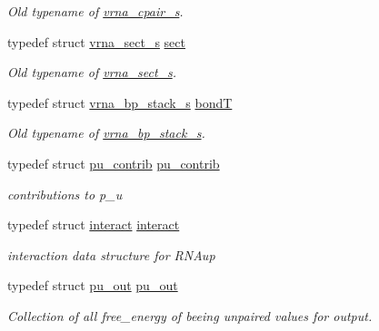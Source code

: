 \begin{DoxyCompactItemize}
\begin{DoxyCompactList}\small\item\em Old typename of \mbox{\hyperlink{group__data__structures_structvrna__cpair__s}{vrna\+\_\+cpair\+\_\+s}}. \end{DoxyCompactList}\item 
typedef struct \mbox{\hyperlink{group__data__structures_structvrna__sect__s}{vrna\+\_\+sect\+\_\+s}} \mbox{\hyperlink{group__data__structures_gaaacedee1f05d3d45aa6764eca51a8876}{sect}}
\begin{DoxyCompactList}\small\item\em Old typename of \mbox{\hyperlink{group__data__structures_structvrna__sect__s}{vrna\+\_\+sect\+\_\+s}}. \end{DoxyCompactList}\item 
typedef struct \mbox{\hyperlink{group__data__structures_structvrna__bp__stack__s}{vrna\+\_\+bp\+\_\+stack\+\_\+s}} \mbox{\hyperlink{group__data__structures_gaaeed53a7508c6ce549a98223e94b25df}{bondT}}
\begin{DoxyCompactList}\small\item\em Old typename of \mbox{\hyperlink{group__data__structures_structvrna__bp__stack__s}{vrna\+\_\+bp\+\_\+stack\+\_\+s}}. \end{DoxyCompactList}\item 
typedef struct \mbox{\hyperlink{group__data__structures_structpu__contrib}{pu\+\_\+contrib}} \mbox{\hyperlink{group__data__structures_ga20881ac02e5932356c09b070efedb560}{pu\+\_\+contrib}}
\begin{DoxyCompactList}\small\item\em contributions to p\+\_\+u \end{DoxyCompactList}\item 
typedef struct \mbox{\hyperlink{group__data__structures_structinteract}{interact}} \mbox{\hyperlink{group__data__structures_ga5a052dbe39d3ca1b13932934b13f5263}{interact}}
\begin{DoxyCompactList}\small\item\em interaction data structure for R\+N\+Aup \end{DoxyCompactList}\item 
typedef struct \mbox{\hyperlink{group__data__structures_structpu__out}{pu\+\_\+out}} \mbox{\hyperlink{group__data__structures_ga501763bd204b60f40e3ab68b40023023}{pu\+\_\+out}}
\begin{DoxyCompactList}\small\item\em Collection of all free\+\_\+energy of beeing unpaired values for output. \end{DoxyCompactList}\item 

\end{DoxyCompactItemize}
